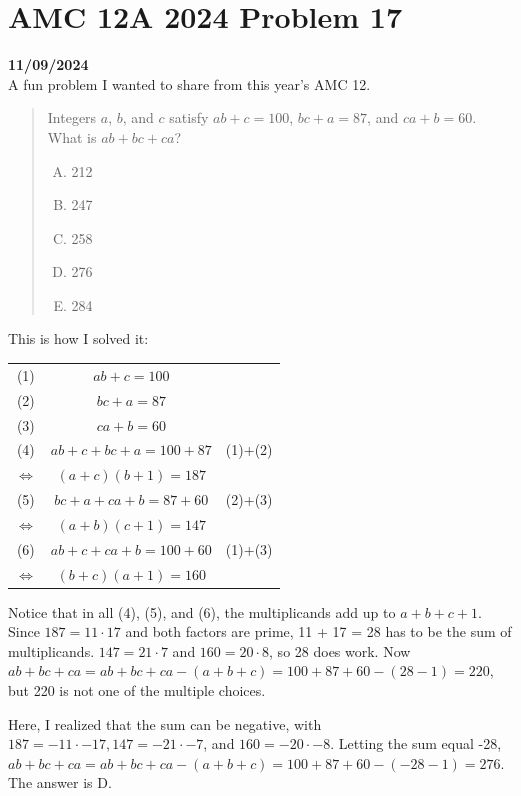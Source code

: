 \documentclass[12pt, oneside]{article}
\begin{document}
\section*{AMC 12A 2024 Problem 17}
\textbf{11/09/2024}\\
A fun problem I wanted to share from this year's AMC 12.
\begin{quote}
Integers $a$, $b$, and $c$ satisfy $ab + c = 100$, $bc + a = 87$, and $ca + b = 60$. What is $ab + bc + ca$?
\begin{enumerate} [A)]
\item 212
\item 247
\item 258
\item 276
\item 284
\end{enumerate}
\end{quote}
This is how I solved it:
\begin{center}
\begin{tabular} {ccc}
(1)&$ab + c = 100$&\\
(2)&$bc + a = 87$&\\
(3)&$ca + b = 60$&\\
(4)&$ab + c + bc + a = 100 + 87$&(1)+(2)\\
$\Leftrightarrow$&$(a+c)(b+1) = 187$&\\
(5)&$bc + a + ca + b = 87 + 60$&(2)+(3)\\
$\Leftrightarrow$&$(a+b)(c+1) = 147$&\\
(6)&$ab + c + ca + b = 100 + 60$&(1)+(3)\\
$\Leftrightarrow$&$(b+c)(a+1) = 160$&\\
\end{tabular}
\end{center}
Notice that in all (4), (5), and (6), the multiplicands add up to $a+b+c+1$. Since $187 = 11 \cdot 17$ and both factors are prime, 11 + 17 = 28 has to be the sum of multiplicands. $147 = 21 \cdot 7$ and $160 = 20 \cdot 8$, so 28 does work. Now $ab + bc + ca = ab + bc + ca - (a + b + c) = 100 + 87 + 60 - (28 - 1) = 220$, but 220 is not one of the multiple choices. 

Here, I realized that the sum can be negative, with $187 = -11 \cdot -17, 147 = -21 \cdot -7$, and $160 = -20 \cdot -8$. Letting the sum equal -28, $ab + bc + ca = ab + bc + ca - (a + b + c) = 100 + 87 + 60 - (-28 - 1) = 276$. The answer is D.
\end{document}
